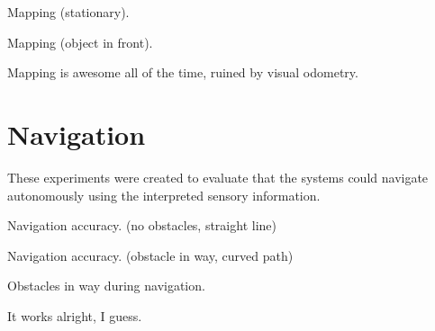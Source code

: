 Mapping (stationary).

Mapping (object in front).

Mapping is awesome all of the time, ruined by visual odometry.

\section{Navigation}

These experiments were created to evaluate that the systems could navigate autonomously using the interpreted sensory information.

Navigation accuracy. (no obstacles, straight line)

Navigation accuracy. (obstacle in way, curved path)

Obstacles in way during navigation.

It works alright, I guess.